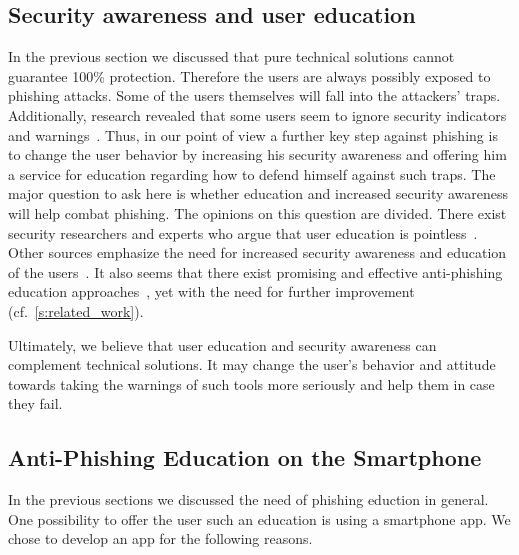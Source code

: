  \subsection{Security awareness and user education}
 In the previous section we discussed that pure technical solutions cannot guarantee 100\% protection.
 Therefore the users are always possibly exposed to phishing attacks.
 Some of the users themselves will fall into the attackers' traps.
 Additionally, research revealed that some users seem to ignore security indicators and warnings~\cite{akhawe2013alice}.
 Thus, in our point of view a further key step against phishing is to change the user behavior by increasing his security awareness and offering him a service for education regarding how to defend himself against such traps.
The major question to ask here is whether education and increased security awareness will help combat phishing.
The opinions on this question are divided.
There exist security researchers and experts who argue that user education is pointless~\cite{useredupointless, bruceschneieronsecuritytraining}.
Other sources emphasize the need for increased security awareness and education of the users~\cite{usereducebit, usereduscmagazine}.
It also seems that there exist promising and effective anti-phishing education approaches~\cite{kumaraguru2007protecting, sheng2007antiphishingphil}, yet with the need for further improvement (cf.~\autoref{s:related_work}).

Ultimately, we believe that user education and security awareness can complement technical solutions. It may change the user's behavior and attitude towards taking the warnings of such tools more seriously and help them in case they fail.

\subsection{Anti-Phishing Education on the Smartphone}
\label{s:antiphishing_on_smartphone}
In the previous sections we discussed the need of phishing eduction in general. One possibility to offer the user such an education is using a smartphone app.
We chose to develop an app for the following reasons.

